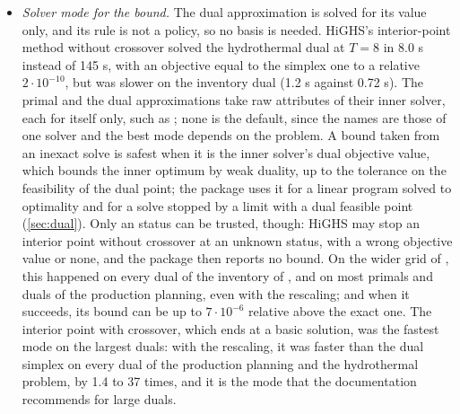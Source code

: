 \begin{itemize}
So  left them out and  kept them (; , ``Past studies'').
A wider study, on four problems and four modes of HiGHS, before the rescaling of \cref{sec:rescaling} (), confirmed the choice of the primal, except for the production planning with 3 breakpoints;
for the dual, leaving them out was faster on 13 of the 15 instances solved both ways by the interior point with crossover, by up to 20 times,
but slower by 1.4 to 2.4 times on three of the six hydrothermal instances under the dual simplex.
Repeated with the rescaling on the production planning and the hydrothermal problem, leaving them out was faster on every primal, under the dual simplex and the interior point with crossover,
and faster or as fast on every dual under the interior point with crossover, but still 2 and 3.3 times slower on two hydrothermal duals under the dual simplex.
So both formulations leave them out by default.
\item \emph{Solver mode for the bound.} The dual approximation is solved for its value only, and its rule is not a policy, so no basis is needed.
HiGHS's interior-point method without crossover solved the hydrothermal dual at $T = 8$ in 8.0 s instead of 145 s,
with an objective equal to the simplex one to a relative $2\cdot10^{-10}$, but was slower on the inventory dual (1.2 s against 0.72 s).
The primal and the dual approximations take raw attributes of their inner solver, each for itself only,
such as ;
none is the default, since the names are those of one solver and the best mode depends on the problem.
A bound taken from an inexact solve is safest when it is the inner solver's dual objective value, which bounds the inner optimum by weak duality, up to the tolerance on the feasibility of the dual point;
the package uses it for a linear program solved to optimality and for a solve stopped by a limit with a dual feasible point (\cref{sec:dual}).
Only an  status can be trusted, though: HiGHS may stop an interior point without crossover at an unknown status,
with a wrong objective value or none, and the package then reports no bound.
On the wider grid of , this happened on every dual of the inventory of \citet{KWG2011}, and on most primals and duals of the production planning, even with the rescaling;
and when it succeeds, its bound can be up to $7\cdot10^{-6}$ relative above the exact one.
The interior point with crossover, which ends at a basic solution, was the fastest mode on the largest duals:
with the rescaling, it was faster than the dual simplex on every dual of the production planning and the hydrothermal problem, by 1.4 to 37 times,
and it is the mode that the documentation recommends for large duals.
\end{itemize}

